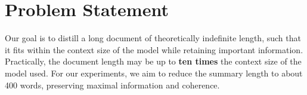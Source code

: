 \section{Problem Statement}
\label{sec:problem}

Our goal is to distill a long document of theoretically indefinite length, such that
it fits within the context size of the model while retaining important information.
Practically, the document length may be up to \textbf{ten times} the context size
of the model used.
For our experiments, we aim to reduce the summary length to about 400 words, preserving
maximal information and coherence.
